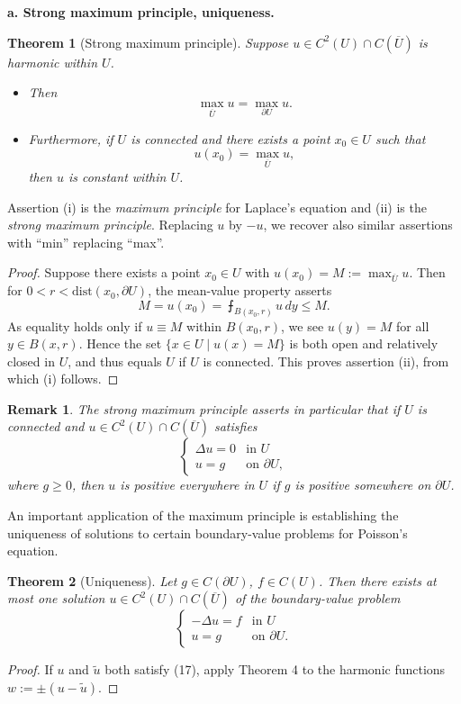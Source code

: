 \documentclass[a4paper,12pt]{report}
\newtheorem{theorem}{Theorem}[section]
\newtheorem{remark}{Remark}[section]
\begin{document}
\noindent
\textbf{a. Strong maximum principle, uniqueness.}
\begin{theorem}[Strong maximum principle]
Suppose \( u \in C^2(U) \cap C(\overline{U}) \) is harmonic within \( U \).
\begin{itemize}
    \item[(i)] Then
    \[
    \max_{\overline{U}} u = \max_{\partial U} u.
    \]
    \item[(ii)] Furthermore, if \( U \) is connected and there exists a point \( x_0 \in U \) such that 
    \[
    u(x_0) = \max_{\overline{U}} u,
    \]
    then \( u \) is constant within \( U \).
\end{itemize}
\end{theorem}
Assertion (i) is the \textit{maximum principle} for Laplace’s equation and (ii) is the \textit{strong maximum principle}. Replacing \( u \) by \( -u \), we recover also similar assertions with “min” replacing “max”.
\begin{proof}
Suppose there exists a point \( x_0 \in U \) with \( u(x_0) = M := \max_{\overline{U}} u \). Then for \( 0 < r < \text{dist}(x_0, \partial U) \), the mean-value property asserts
\[
M = u(x_0) = \intbar_{B(x_0, r)} u \, dy \leq M.
\]
As equality holds only if \( u \equiv M \) within \( B(x_0, r) \), we see \( u(y) = M \) for all \( y \in B(x, r) \). Hence the set \( \{x \in U \mid u(x) = M\} \) is both open and relatively closed in \( U \), and thus equals \( U \) if \( U \) is connected. This proves assertion (ii), from which (i) follows.
\end{proof}
\begin{remark}
The strong maximum principle asserts in particular that if \( U \) is connected and \( u \in C^2(U) \cap C(\overline{U}) \) satisfies
\[
\begin{cases}
    \Delta u = 0 & \text{in } U \\
    u = g & \text{on } \partial U,
\end{cases}
\]
where \( g \geq 0 \), then \( u \) is positive everywhere in \( U \) if \( g \) is positive somewhere on \( \partial U \).
\end{remark}
An important application of the maximum principle is establishing the uniqueness of solutions to certain boundary-value problems for Poisson’s equation.
\begin{theorem}[Uniqueness]
Let \( g \in C(\partial U) \), \( f \in C(U) \). Then there exists at most one solution \( u \in C^2(U) \cap C(\overline{U}) \) of the boundary-value problem
\[
\begin{cases}
    -\Delta u = f & \text{in } U \\
    u = g & \text{on } \partial U.
\end{cases}
\]
\end{theorem}
\begin{proof}
If \( u \) and \( \tilde{u} \) both satisfy (17), apply Theorem 4 to the harmonic functions \( w := \pm(u - \tilde{u}) \).
\end{proof}
\end{document}

